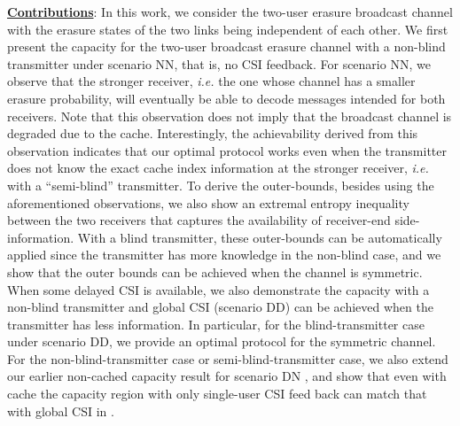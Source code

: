 \documentclass[journal,12pt,draftcls,onecolumn]{IEEEtran}
\begin{document}
\noindent \underline{\bf Contributions}: 
{In this work, we consider the two-user erasure broadcast channel with the erasure states of the two links being independent of each other.} We first present the capacity for the two-user broadcast erasure channel with a non-blind transmitter under scenario NN, that is, no CSI feedback. For scenario NN, we observe that the stronger receiver, \emph{i.e.} the one whose channel has a smaller erasure probability, will eventually be able to decode messages intended for both receivers. Note that this observation does not imply that the broadcast channel is degraded due to the cache.  Interestingly, the achievability derived from this observation indicates that our optimal protocol works even when the transmitter does not know the exact cache index information at the stronger receiver, \emph{i.e.} with a ``semi-blind'' transmitter. To derive the outer-bounds, besides using the aforementioned observations, we also show an extremal entropy inequality between the two receivers that captures the availability of receiver-end side-information. With a blind transmitter, these outer-bounds can be automatically applied since the transmitter has more knowledge in the non-blind case, and {we show that the outer bounds} can be achieved when the channel is symmetric.  When some delayed CSI is available, we also demonstrate the capacity with a non-blind transmitter and global CSI (scenario DD) \cite{ghorbel2016content} can be achieved when the transmitter has less information. In particular, for the blind-transmitter case under scenario DD, we provide an optimal protocol for the symmetric channel. For the non-blind-transmitter case or semi-blind-transmitter case, we also extend our earlier non-cached capacity result for scenario DN \cite{lin2019no}, and show that even with cache the capacity region with only single-user CSI feed back can match that with global CSI in \cite{ghorbel2016content}.





\end{document}
